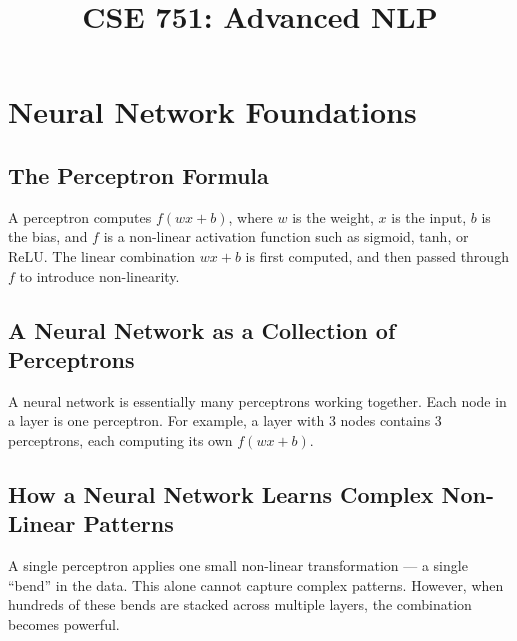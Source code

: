 \documentclass[12pt,a4paper]{article}
\title{\textbf{CSE 751: Advanced NLP} \\}
\author{}
\date{}
\begin{document}
\maketitle
\tableofcontents
\newpage



\section{Neural Network Foundations}

\subsection{The Perceptron Formula}

A perceptron computes $f(wx + b)$, where $w$ is the weight, $x$ is the input, $b$ is the
bias, and $f$ is a non-linear activation function such as sigmoid, tanh, or ReLU. The
linear combination $wx + b$ is first computed, and then passed through $f$ to introduce
non-linearity.

\subsection{A Neural Network as a Collection of Perceptrons}

A neural network is essentially many perceptrons working together. Each node in a layer
is one perceptron. For example, a layer with 3 nodes contains 3 perceptrons, each
computing its own $f(wx + b)$.

\subsection{How a Neural Network Learns Complex Non-Linear Patterns}

A single perceptron applies one small non-linear transformation --- a single ``bend'' in
the data. This alone cannot capture complex patterns. However, when hundreds of these
bends are stacked across multiple layers, the combination becomes powerful.
\end{document}
